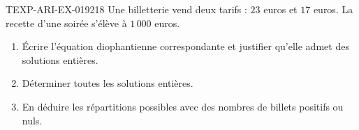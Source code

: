 \begin{exercice}{TEXP-ARI-EX-019}{2}{18}
Une billetterie vend deux tarifs : $23$ euros et $17$ euros. La recette d'une
soirée s'élève à $1\,000$ euros.
\begin{enumerate}
  \item Écrire l'équation diophantienne correspondante et justifier qu'elle
        admet des solutions entières.
  \item Déterminer toutes les solutions entières.
  \item En déduire les répartitions possibles avec des nombres de billets
        positifs ou nuls.
\end{enumerate}
\end{exercice}
